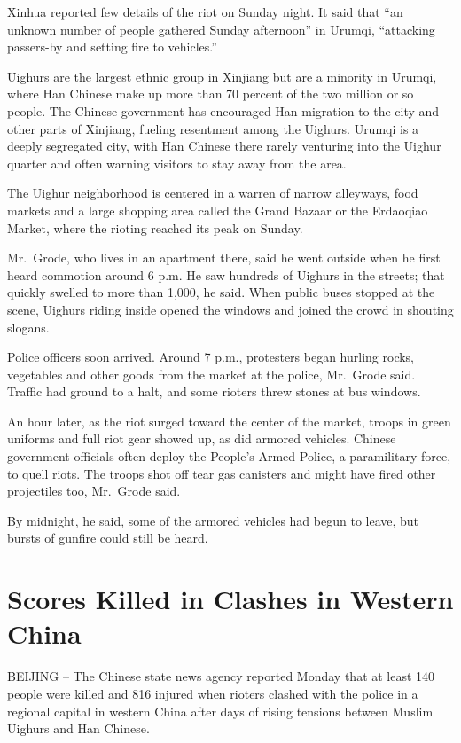 ﻿\documentclass[12pt]{article}
\begin{document}
Xinhua reported few details of the riot on Sunday night. It said that ``an unknown number of people
gathered Sunday afternoon'' in Urumqi, ``attacking passers-by and setting fire to vehicles.''

Uighurs are the largest ethnic group in Xinjiang but are a minority in Urumqi, where Han Chinese
make up more than 70 percent of the two million or so people. The Chinese government has encouraged
Han migration to the city and other parts of Xinjiang, fueling resentment among the Uighurs. Urumqi
is a deeply segregated city, with Han Chinese there rarely venturing into the Uighur quarter and
often warning visitors to stay away from the area.

The Uighur neighborhood is centered in a warren of narrow alleyways, food markets and a large
shopping area called the Grand Bazaar or the Erdaoqiao Market, where the rioting reached its peak on
Sunday.

Mr.~Grode, who lives in an apartment there, said he went outside when he first heard commotion
around 6 p.m. He saw hundreds of Uighurs in the streets; that quickly swelled to more than 1,000, he
said. When public buses stopped at the scene, Uighurs riding inside opened the windows and joined
the crowd in shouting slogans.

Police officers soon arrived. Around 7 p.m., protesters began hurling rocks, vegetables and other
goods from the market at the police, Mr.~Grode said. Traffic had ground to a halt, and some rioters
threw stones at bus windows.

An hour later, as the riot surged toward the center of the market, troops in green uniforms and full
riot gear showed up, as did armored vehicles. Chinese government officials often deploy the People's
Armed Police, a paramilitary force, to quell riots. The troops shot off tear gas canisters and might
have fired other projectiles too, Mr.~Grode said.

By midnight, he said, some of the armored vehicles had begun to leave, but bursts of gunfire could still be heard.

\section{Scores Killed in Clashes in Western China}

BEIJING -- The Chinese state news agency reported Monday that at least 140 people were killed and
816 injured when rioters clashed with the police in a regional capital in western China after days
of rising tensions between Muslim Uighurs and Han Chinese.
\end{document}
